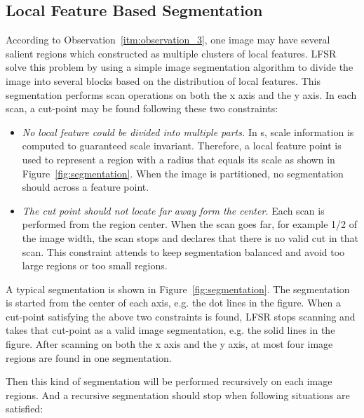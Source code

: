 \subsection{Local Feature Based Segmentation}
\label{sec:algorithm_segmentation}

According to Observation~\ref{itm:observation_3}, one image may have several salient regions which constructed as multiple clusters of local features. LFSR solve this problem by using a simple image segmentation algorithm to divide the image into several blocks based on the distribution of local features. This segmentation performs scan operations on both the x axis and the y axis. In each scan, a cut-point may be found following these two constraints:

\begin{itemize}

  \item \textit{No local feature could be divided into multiple parts.} In {\lfea}s, scale information is computed to guaranteed scale invariant. Therefore, a local feature point is used to represent a region with a radius that equals its scale as shown in Figure~\ref{fig:segmentation}. When the image is partitioned, no segmentation should across a feature point.

  \item \textit{The cut point should not locate far away form the center.} Each scan is performed from the region center. When the scan goes far, for example 1/2 of the image width, the scan stops and declares that there is no valid cut in that scan. This constraint attends to keep segmentation balanced and avoid too large regions or too small regions.

\end{itemize}

A typical segmentation is shown in Figure~\ref{fig:segmentation}. The segmentation is started from the center of each axis, e.g. the dot lines in the figure. When a cut-point satisfying the above two constraints is found, LFSR stops scanning and takes that cut-point as a valid image segmentation, e.g. the solid lines in the figure. After scanning on both the x axis and the y axis, at most four image regions are found in one segmentation.

Then this kind of segmentation will be performed recursively on each image regions. And a recursive segmentation should stop when following situations are satisfied:

